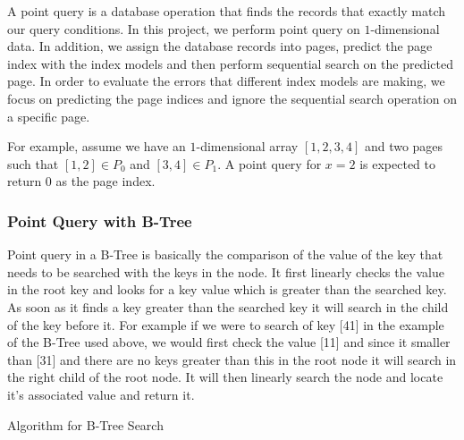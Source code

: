 A point query is a database operation that finds the records that exactly match our query conditions. In this project, we perform point query on $1$-dimensional data. In addition, we assign the database records into pages, predict the page index with the index models and then perform sequential search on the predicted page. In order to evaluate the errors that different index models are making, we focus on predicting the page indices and ignore the sequential search operation on a specific page. 

\begin{mscexample}
For example, assume we have an $1$-dimensional array $[1,2,3,4]$ and two pages such that $[1,2]\in P_0$ and $[3,4]\in P_1$. A point query for $x=2$ is expected to return 0 as the page index.
\end{mscexample}

\subsubsection{Point Query with B-Tree}


Point query in a B-Tree is basically the comparison of the value of the key that needs to be searched with the keys in the node. It first linearly checks the value in the root key and looks for a key value which is greater than the searched key. As soon as it finds a key greater than the searched key it will search in the child of the key before it. For example if we were to search of key [41] in the example of the B-Tree used above, we would first check the value [11] and since it smaller than [31] and there are no keys greater than this in the root node it will search in the right child of the root node. It will then linearly search the node and locate it's associated value and return it.

\begin{algorithm}[H]
    \SetAlgoLined
     \caption{Algorithm for B-Tree Search}
     \label{B-Tree Search}
\end{algorithm}

